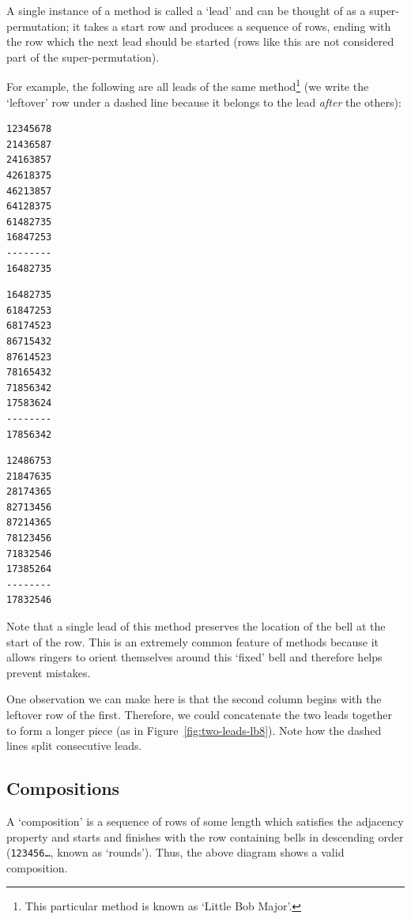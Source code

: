 \documentclass[12pt]{article}
\newcommand{\row}[1]{\texttt{#1}}
\begin{document}
A single instance of a method is called a `lead' and can be thought of as a super-permutation; it
takes a start row and produces a sequence of rows, ending with the row which the next lead should be
started (rows like this are not considered part of the super-permutation).

For example, the following are all leads of the same method\footnote{This particular method is known
as `Little Bob Major'.} (we write the `leftover' row under a dashed line because it belongs to the
lead \emph{after} the others):

\begin{multicols}{3}

\centering
\begin{BVerbatim}
12345678
21436587
24163857
42618375
46213857
64128375
61482735
16847253
--------
16482735
\end{BVerbatim}

\centering
\begin{BVerbatim}
16482735
61847253
68174523
86715432
87614523
78165432
71856342
17583624
--------
17856342
\end{BVerbatim}

\centering
\begin{BVerbatim}
12486753
21847635
28174365
82713456
87214365
78123456
71832546
17385264
--------
17832546
\end{BVerbatim}

\end{multicols}

Note that a single lead of this method preserves the location of the bell at the start of the
row.  This is an extremely common feature of methods because it allows ringers to orient
themselves around this `fixed' bell and therefore helps prevent mistakes.

One observation we can make here is that the second column begins with the leftover row of the
first.  Therefore, we could concatenate the two leads together to form a longer piece (as in
Figure~\ref{fig:two-leads-lb8}). Note how the dashed lines split consecutive leads.

\subsection{Compositions}

A `composition' is a sequence of rows of some length which satisfies the adjacency property and
starts and finishes with the row containing bells in descending order (\row{123456\ldots}, known as
`rounds').  Thus, the above diagram shows a valid composition.
\end{document}
